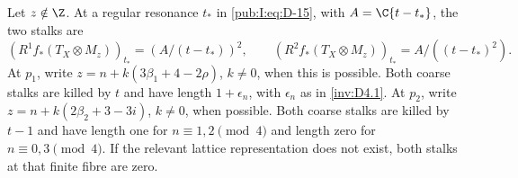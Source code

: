 \begin{proposition}\hypertarget{tag-01SR}{}\label{inv:D4.4}

Let $z\notin\Z$. At a regular resonance $t_*$ in \eqref{pub:I:eq:D-15}, with
$A=\C\{t-t_*\}$, the two stalks are
\begin{equation}
 (R^1f_*(T_X\otimes M_z))_{t_*}=(A/(t-t_*))^2,
 \qquad (R^2f_*(T_X\otimes M_z))_{t_*}=A/((t-t_*)^2).
\label{pub:I:eq:D-18}
\end{equation}
At $p_1$, write $z=n+k(3\beta_1+4-2\rho)$, $k\ne0$, when this is
possible. Both coarse stalks are killed by $t$ and have length
$1+\epsilon_n$, with $\epsilon_n$ as in \ref{inv:D4.1}.
At $p_2$, write $z=n+k(2\beta_2+3-3i)$, $k\ne0$, when possible.
Both coarse stalks are killed by $t-1$ and have length one for
$n\equiv1,2\pmod4$ and length zero for $n\equiv0,3\pmod4$.
If the relevant lattice representation does not exist, both stalks
at that finite fibre are zero.
\end{proposition}



